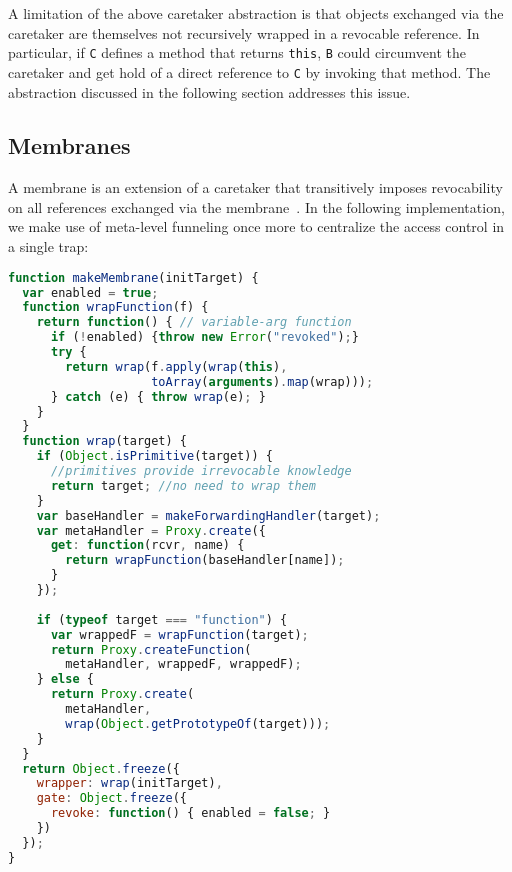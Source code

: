 \documentclass{acm_proc_article-sp}
\begin{document}

A limitation of the above caretaker abstraction is that objects exchanged via the caretaker are themselves not recursively wrapped in a revocable reference. In particular, if \texttt{C} defines a method that returns \texttt{this}, \texttt{B} could circumvent the caretaker and get hold of a direct reference to \texttt{C} by invoking that method. The abstraction discussed in the following section addresses this issue.

\subsection{Membranes}
\label{sub:membranes}

A membrane is an extension of a caretaker that transitively imposes revocability on all references exchanged via the membrane~\cite{robust_composition}. In the following implementation, we make use of meta-level funneling once more to centralize the access control in a single trap:

\begin{lstlisting}[language=javascript]
function makeMembrane(initTarget) {
  var enabled = true;
  function wrapFunction(f) {
    return function() { // variable-arg function
      if (!enabled) {throw new Error("revoked");}
      try {
        return wrap(f.apply(wrap(this),
                    toArray(arguments).map(wrap)));
      } catch (e) { throw wrap(e); } 
    }
  }
  function wrap(target) {
    if (Object.isPrimitive(target)) {
      //primitives provide irrevocable knowledge
      return target; //no need to wrap them
    } 
    var baseHandler = makeForwardingHandler(target);
    var metaHandler = Proxy.create({
      get: function(rcvr, name) {
        return wrapFunction(baseHandler[name]);
      }
    });
    
    if (typeof target === "function") {
      var wrappedF = wrapFunction(target);
      return Proxy.createFunction(
        metaHandler, wrappedF, wrappedF);
    } else {
      return Proxy.create(
        metaHandler,
        wrap(Object.getPrototypeOf(target)));
    }
  }
  return Object.freeze({
    wrapper: wrap(initTarget),
    gate: Object.freeze({
      revoke: function() { enabled = false; }
    })
  });
}
\end{lstlisting}
\end{document}
